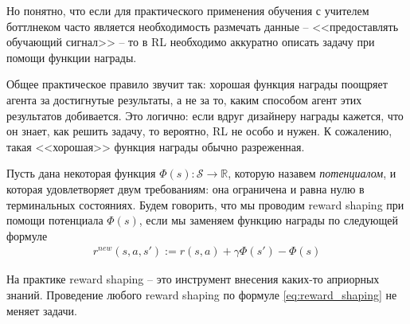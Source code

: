 \documentclass[%
	11pt,
	a4paper,
	utf8,
		]{article}
\begin{document}
Но понятно, что если для практического применения обучения с учителем боттлнеком часто является необходимость размечать данные -- <<предоставлять обучающий сигнал>> -- то в RL необходимо аккуратно описать задачу при помощи функции награды.

Общее практическое правило звучит так: хорошая функция награды поощряет агента за достигнутые результаты, а не за то, каким способом агент этих результатов добивается. Это логично: если вдруг дизайнеру награды кажется, что он знает, как решить задачу, то вероятно, RL не особо и нужен. К сожалению, такая <<хорошая>> функция награды обычно разреженная.

Пусть дана некоторая функция $ \Phi (s): \mathcal{S} \rightarrow \mathbb{R} $, которую назавем \emph{потенциалом}, и которая удовлетворяет двум требованиям: она ограничена и равна нулю в терминальных состояниях. Будем говорить, что мы проводим reward shaping при помощи потенциала $ \Phi(s) $, если мы заменяем функцию награды по следующей формуле
\begin{align}\label{eq:reward_shaping}
	r^{new}(s, a, s') := r(s,a) + \gamma \Phi (s') - \Phi(s)
\end{align}

На практике reward shaping -- это инструмент внесения каких-то априорных знаний. Проведение любого reward shaping по формуле \eqref{eq:reward_shaping} не меняет задачи.




\listoffigures{}

\begin{thebibliography}{99}
	
	
	
		
\end{thebibliography}
\end{document}
